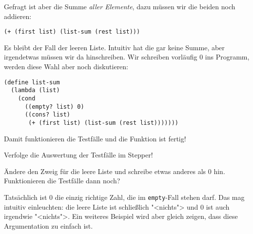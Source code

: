 %
Gefragt
ist aber die Summe \emph{aller Elemente}, dazu müssen wir die beiden
noch addieren:
%
\begin{lstlisting}
(+ (first list) (list-sum (rest list)))
\end{lstlisting}
%
Es bleibt der Fall der leeren Liste.  Intuitiv hat die gar keine
Summe, aber irgendetwas müssen wir da hinschreiben.  Wir schreiben 
vorläufig 0 ins Programm, werden diese Wahl aber noch diskutieren:
%
\begin{lstlisting}
(define list-sum
  (lambda (list)
    (cond
      ((empty? list) 0)
      ((cons? list)
       (+ (first list) (list-sum (rest list)))))))
\end{lstlisting}
%
Damit funktionieren die Testfälle und die Funktion ist fertig!

\begin{aufgabeinline}
  Verfolge die Auswertung der Testfälle im Stepper!
\end{aufgabeinline}

\begin{aufgabeinline}
  Ändere den Zweig für die leere Liste und schreibe etwas anderes als
  0 hin.  Funktionieren die Testfälle dann noch?
\end{aufgabeinline}
%
Tatsächlich ist 0 die einzig richtige Zahl, die im
\lstinline{empty}-Fall stehen darf.  Das mag intuitiv einleuchten: die
leere Liste ist schließlich "<nichts"> und 0 ist auch irgendwie
"<nichts">.  Ein weiteres Beispiel wird aber gleich zeigen, dass diese
Argumentation zu einfach ist.

